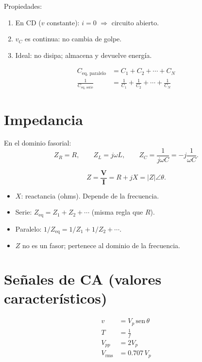 \documentclass[11pt,a4paper]{article}
\begin{document}
Propiedades:
\begin{enumerate}
  \item En CD (\(v\) constante): \(i=0\) \(\Rightarrow\) circuito abierto.
  \item \(v_C\) es continua: no cambia de golpe.
  \item Ideal: no disipa; almacena y devuelve energía.
\end{enumerate}

\begin{align}
C_{\mathrm{eq,\,paralelo}} &= C_1+C_2+\cdots+C_N \tag{2.10}\\
\frac{1}{C_{\mathrm{eq,\,serie}}} &= \frac{1}{C_1}+\frac{1}{C_2}+\cdots+\frac{1}{C_N} \tag{2.11}
\end{align}

\section{Impedancia}

En el dominio fasorial:
\begin{equation}
Z_R=R,\qquad Z_L=j\omega L,\qquad Z_C=\frac{1}{j\omega C}=-j\frac{1}{\omega C}.
\tag{2.12--2.13}
\end{equation}

\[
Z=\frac{\mathbf{V}}{\mathbf{I}}=R+jX=|Z|\angle\theta.
\]

\begin{itemize}
  \item \(X\): reactancia (ohms). Depende de la frecuencia.
  \item Serie: \(Z_{\mathrm{eq}}=Z_1+Z_2+\cdots\) (misma regla que \(R\)).
  \item Paralelo: \(1/Z_{\mathrm{eq}}=1/Z_1+1/Z_2+\cdots\).
  \item \(Z\) no es un fasor; pertenece al dominio de la frecuencia.
\end{itemize}

\section{Señales de CA (valores característicos)}

\begin{align}
v &= V_p\,\mathrm{sen}\,\theta \tag{2.16}\\
T &= \frac{1}{f}\\
V_{pp} &= 2V_p\\
V_{\mathrm{rms}} &= 0.707\,V_p \tag{2.17}
\end{align}
\end{document}

